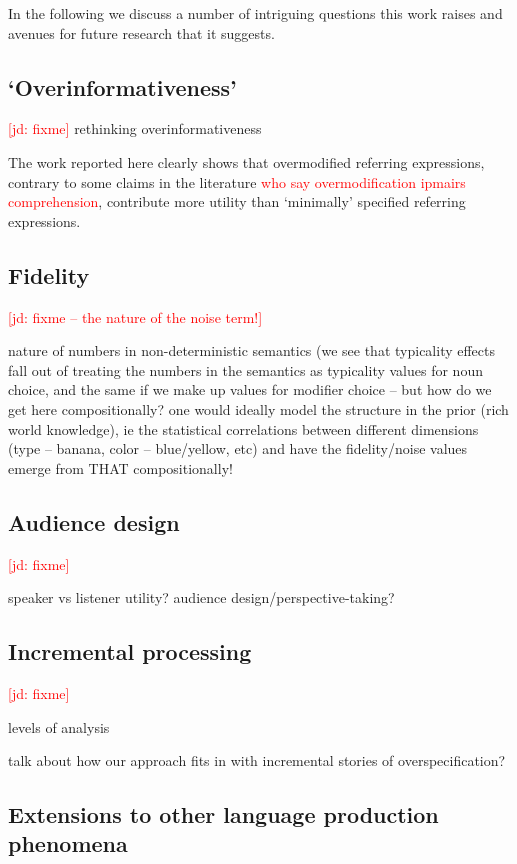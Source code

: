 \documentclass[11pt]{article}
\newcommand{\red}[1]{\textcolor{Red}{#1}}
\newcommand{\jd}[1]{\textcolor{Red}{[jd: #1]}}
\begin{document}
In the following we discuss a number of intriguing questions this work raises and avenues for future research that it suggests.

\subsection{`Overinformativeness'}

\jd{fixme}
rethinking overinformativeness

The work reported here clearly shows that overmodified referring expressions, contrary to some claims in the literature \cite{Engelhardt2011} \red{who say overmodification ipmairs comprehension}, contribute more utility than `minimally' specified referring expressions.

\subsection{Fidelity}

\jd{fixme -- the nature of the noise term!}

nature of numbers in non-deterministic semantics (we see that typicality effects fall out of treating the numbers in the semantics as typicality values for noun choice, and the same if we make up values for modifier choice -- but how do we get here compositionally? one would ideally model the structure in the prior (rich world knowledge), ie the statistical correlations between different dimensions (type -- banana, color -- blue/yellow, etc) and have the fidelity/noise values emerge from THAT compositionally!

\subsection{Audience design}

\jd{fixme}

speaker vs listener utility? audience design/perspective-taking?

\subsection{Incremental processing}

\jd{fixme}

levels of analysis

talk about how our approach fits in with incremental stories of overspecification?

\subsection{Extensions to other language production phenomena}
\end{document}
